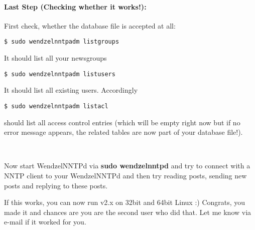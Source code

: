 \paragraph*{Last Step (Checking whether it works!):}

First check, whether the database file is accepted at all:

\begin{verbatim}
$ sudo wendzelnntpadm listgroups
\end{verbatim}

It should list all your newsgroups

\begin{verbatim}
$ sudo wendzelnntpadm listusers
\end{verbatim}

It should list all existing users. Accordingly

\begin{verbatim}
$ sudo wendzelnntpadm listacl
\end{verbatim}

should list all access control entries (which will be empty right now but if no error message appears, the related tables are now part of your database file!).

~

Now start WendzelNNTPd via \textbf{sudo wendzelnntpd} and try to connect with a NNTP client to your WendzelNNTPd and then try reading posts, sending new posts and replying to these posts.

If this works, you can now run v2.x on 32bit and 64bit Linux :) Congrats, you made it and chances are you are the second user who did that. Let me know via e-mail if it worked for you.
